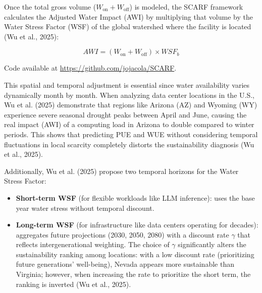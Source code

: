 \documentclass[conference]{IEEEtran}
\begin{document}
Once the total gross volume ($W_{\text{on}} + W_{\text{off}}$) is modeled, the SCARF framework calculates the Adjusted Water Impact (AWI) by multiplying that volume by the Water Stress Factor (WSF) of the global watershed where the facility is located (Wu et al., 2025):

\begin{equation}
AWI = (W_{\text{on}} + W_{\text{off}}) \times WSF_b
\end{equation}

Code available at \url{https://github.com/jojacola/SCARF}.

This spatial and temporal adjustment is essential since water availability varies dynamically month by month. When analyzing data center locations in the U.S., Wu et al. (2025) demonstrate that regions like Arizona (AZ) and Wyoming (WY) experience severe seasonal drought peaks between April and June, causing the real impact (AWI) of a computing load in Arizona to double compared to winter periods. This shows that predicting PUE and WUE without considering temporal fluctuations in local scarcity completely distorts the sustainability diagnosis (Wu et al., 2025).

Additionally, Wu et al. (2025) propose two temporal horizons for the Water Stress Factor:

\begin{itemize}
\item \textbf{Short-term WSF} (for flexible workloads like LLM inference): uses the base year water stress without temporal discount.
\item \textbf{Long-term WSF} (for infrastructure like data centers operating for decades): aggregates future projections (2030, 2050, 2080) with a discount rate $\gamma$ that reflects intergenerational weighting. The choice of $\gamma$ significantly alters the sustainability ranking among locations: with a low discount rate (prioritizing future generations' well-being), Nevada appears more sustainable than Virginia; however, when increasing the rate to prioritize the short term, the ranking is inverted (Wu et al., 2025).
\end{itemize}
\end{document}
